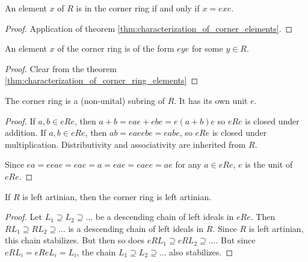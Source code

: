 \begin{theorem}
  \label{thm:characterization_of_corner_ring_elements}
  \leanok
  An element $x$ of $R$ is in the corner ring if and only if $x = e x e$.
\end{theorem}
\begin{proof}
  \leanok
  Application of theorem \ref{thm:characterization_of_corner_elements}.
\end{proof}

\begin{theorem}
  \label{thm:characterization_of_corner_ring_elements'}
  \leanok
  An element $x$ of the corner ring is of the form $e y e$ for some $y \in R$.
\end{theorem}
\begin{proof}
  \leanok
  Clear from the theorem \ref{thm:characterization_of_corner_ring_elements}
\end{proof}

\begin{theorem}
  \label{thm:corner_ring_is_ring}
  \leanok
  The corner ring is a (non-unital) subring of $R$. It has its own unit $e$.
\end{theorem}
\begin{proof}
  \leanok
  If $a, b \in eRe$, then $a + b = e a e + e b e = e (a + b) e$ so $eRe$ is closed under addition.
  If $a, b \in eRe$, then $a b = e a e e b e  = e a b e$, so $eRe$ is closed under multiplication.
  Distributivity and associativity are inherited from $R$.

  Since $e a = eeae = eae = a = eae = eaee = ae$ for any $a \in eRe$, $e$ is the unit of $eRe$.
\end{proof}

\begin{theorem}
  \label{thm:corner_ring_artinian}
  \leanok
  If $R$ is left artinian, then the corner ring is left artinian.
\end{theorem}
\begin{proof}
  \leanok
  Let $L_1 \supseteq L_2 \supseteq \ldots$ be a descending chain of left ideals in $eRe$. Then $ RL_1 \supseteq RL_2 \supseteq \ldots$ is a descending chain of left ideals in $R$. Since $R$ is left artinian, this chain stabilizes. But then so does $eRL_1 \supseteq eRL_2 \supseteq \ldots$. But since $eRL_i = eReL_i = L_i$, the chain $L_1 \supseteq L_2 \supseteq \ldots$ also stabilizes.
\end{proof}

